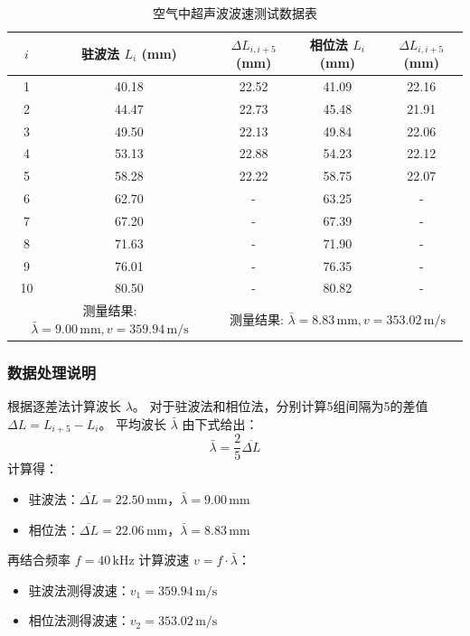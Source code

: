 \documentclass[11pt]{article}
\begin{document}
\begin{table}[h]
    \centering
    \caption{空气中超声波波速测试数据表}
    \label{tab:air_speed}
    \begin{tabular}{ccccc}
    \toprule
    $i$ & 驻波法 $L_i$ (mm) & $\Delta L_{i, i+5}$ (mm) & 相位法 $L_i$ (mm) & $\Delta L_{i, i+5}$ (mm) \\ 
    \midrule
    1  & 40.18 & 22.52 & 41.09 & 22.16 \\ 
    2  & 44.47 & 22.73 & 45.48 & 21.91 \\ 
    3  & 49.50 & 22.13 & 49.84 & 22.06 \\ 
    4  & 53.13 & 22.88 & 54.23 & 22.12 \\ 
    5  & 58.28 & 22.22 & 58.75 & 22.07 \\ 
    6  & 62.70 & - & 63.25 & - \\ 
    7  & 67.20 & - & 67.39 & - \\ 
    8  & 71.63 & - & 71.90 & - \\ 
    9  & 76.01 & - & 76.35 & - \\ 
    10 & 80.50 & - & 80.82 & - \\ 
    \midrule
    \multicolumn{2}{c}{测量结果: $\bar{\lambda}=9.00\,\text{mm}, v = 359.94\,\text{m/s}$} & \multicolumn{3}{c}{测量结果: $\bar{\lambda}=8.83\,\text{mm}, v = 353.02\,\text{m/s}$} \\ 
    \bottomrule
    \end{tabular}
\end{table}

\subsubsection{数据处理说明}

根据逐差法计算波长 $\lambda$。
对于驻波法和相位法，分别计算5组间隔为5的差值 $\Delta L = L_{i+5} - L_i$。
平均波长 $\bar{\lambda}$ 由下式给出：
\[ \bar{\lambda} = \frac{2}{5} \overline{\Delta L} \]
计算得：
\begin{itemize}
    \item 驻波法：$\overline{\Delta L} = 22.50\,\text{mm}$，$\bar{\lambda} = 9.00\,\text{mm}$
    \item 相位法：$\overline{\Delta L} = 22.06\,\text{mm}$，$\bar{\lambda} = 8.83\,\text{mm}$
\end{itemize}

再结合频率 $f = 40\,\text{kHz}$ 计算波速 $v = f \cdot \bar{\lambda}$：
\begin{itemize}
    \item 驻波法测得波速：$v_1 = 359.94\,\text{m/s}$
    \item 相位法测得波速：$v_2 = 353.02\,\text{m/s}$
\end{itemize}
\end{document}
